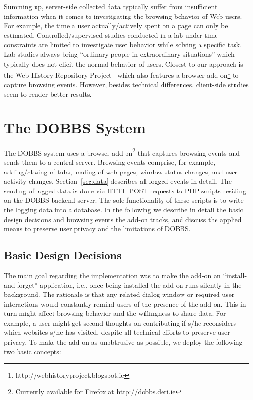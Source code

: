\documentclass[11pt,fleqn,twoside]{article}
\begin{document}
Summing up, server-side collected data typically suffer from insufficient information when it comes to investigating the browsing behavior of Web users. For example, the time a user actually/actively spent on a page can only be estimated. Controlled/supervised studies conducted in a lab under time constraints are limited to investigate user behavior while solving a specific task. Lab studies always bring ``ordinary people in extraordinary situations'' which typically does not elicit the normal behavior of users. Closest to our approach is the Web History Repository Project~\cite{Herder11WHR} which also features a browser add-on\footnote{http://webhistoryproject.blogspot.ie} to capture browsing events. However, besides technical differences, client-side studies seem to render better results.



\section{The DOBBS System}
\label{sec:dobbs}
The DOBBS system uses a browser add-on\footnote{Currently available for Firefox at http://dobbs.deri.ie} that captures browsing events and sends them to a central server. Browsing events comprise, for example, adding/closing of tabs, loading of web pages, window status changes, and user activity changes. Section~\ref{sec:data} describes all logged events in detail. The sending of logged data is done via HTTP POST requests to PHP scripts residing on the DOBBS backend server. The sole functionality of these scripts is to write the logging data into a database. In the following we describe in detail the basic design decisions and browsing events the add-on tracks, and discuss the applied means to preserve user privacy and the limitations of DOBBS.


\subsection{Basic Design Decisions}
\label{sec:designdecisions}
The main goal regarding the implementation was to make the add-on an ``install-and-forget'' application, i.e., once being installed the add-on runs silently in the background. The rationale is that any related dialog window or required user interactions would constantly remind users of the presence of the add-on. This in turn might affect browsing behavior and the willingness to share data. For example, a user might get second thoughts on contributing if s/he reconsiders which websites s/he has visited, despite all technical efforts to preserve user privacy. To make the add-on as unobtrusive as possible, we deploy the following two basic concepts:
\end{document}
